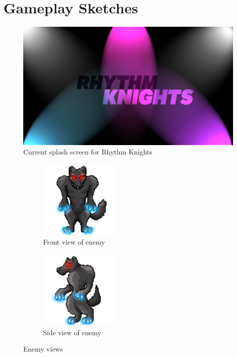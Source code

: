 \documentclass[]{article}
\begin{document}
\pagebreak
\section*{Gameplay Sketches}
\begin{figure}[!htb]
\begin{center}
\leavevmode
\includegraphics[width=4.7in]{img/splash.jpg}
\end{center}
\caption{Current splash screen for Rhythm Knights \label{splashscreen}}
\end{figure}

\begin{figure}[htb!]
\begin{subfigure}{.5\textwidth}
  \centering
  \includegraphics[width= 1.5in]{img/enemy_front.jpg}
  \caption{Front view of enemy
  \label{en_front}}
\end{subfigure}%
\begin{subfigure}{.5\textwidth}
  \centering
  \includegraphics[width=1.5in]{img/enemy_side.jpg}
  \caption{Side view of enemy
  \label{en_side}}
\end{subfigure}%
\caption{Enemy views
\label{enemy}}
\end{figure}
\end{document}
